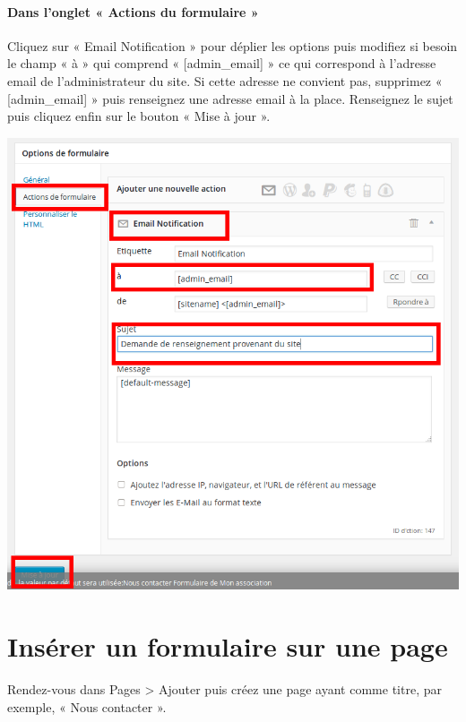 \documentclass[10pt,a4paper]{article}
\begin{document}
\paragraph{Dans l'onglet « Actions du formulaire »} Cliquez sur « Email Notification » pour déplier les options puis modifiez si besoin le champ « à » qui comprend « [admin\_email] » ce qui correspond à l'adresse email de l'administrateur du site. Si cette adresse ne convient pas, supprimez « [admin\_email] » puis renseignez une adresse email à la place. Renseignez le sujet puis cliquez enfin sur le bouton « Mise à jour ».
\begin{center}
\includegraphics[scale=0.3]{img/0188.png}
\end{center}
\section{Insérer un formulaire sur une page}
\paragraph{}Rendez-vous dans Pages > Ajouter puis créez une page ayant comme titre, par exemple, « Nous contacter ».
\end{document}

